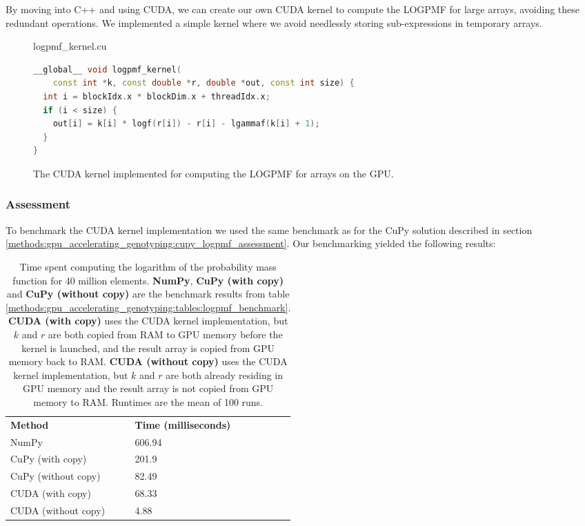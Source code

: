 By moving into C++ and using CUDA, we can create our own CUDA kernel to compute the LOGPMF for large arrays, avoiding these redundant operations.
We implemented a simple kernel where we avoid needlessly storing sub-expressions in temporary arrays.
\begin{figure}[H] 
\begin{center}
logpmf\_kernel.cu
\end{center}
\begin{lstlisting}[language=C++,style=cppcode]
__global__ void logpmf_kernel(
    const int *k, const double *r, double *out, const int size) {
  int i = blockIdx.x * blockDim.x + threadIdx.x;
  if (i < size) {
    out[i] = k[i] * logf(r[i]) - r[i] - lgammaf(k[i] + 1);
  }
}
\end{lstlisting}
\caption{
  The CUDA kernel implemented for computing the LOGPMF for arrays on the GPU.
}
\label{methods:gpu_accelerating_genotyping:figures:logpmf_kernel}
\end{figure}

\subsubsection{Assessment}
To benchmark the CUDA kernel implementation we used the same benchmark as for the CuPy solution described in section \ref{methods:gpu_accelerating_genotyping:cupy_logpmf_assessment}.
Our benchmarking yielded the following results:
\begin{table}[H]
\begin{center}
\begin{tabular}{lllll}
\multicolumn{1}{l|}{\textbf{Method}} & \multicolumn{1}{l}{\textbf{Time (milliseconds)}} &  \\ \cline{1-2}
\multicolumn{1}{l|}{NumPy} & \multicolumn{1}{l}{606.94} &  \\
\multicolumn{1}{l|}{CuPy (with copy)} & \multicolumn{1}{l}{201.9} & \\
\multicolumn{1}{l|}{CuPy (without copy)} & \multicolumn{1}{l}{82.49} & \\
\multicolumn{1}{l|}{CUDA (with copy)} & \multicolumn{1}{l}{68.33} & \\
\multicolumn{1}{l|}{CUDA (without copy)} & \multicolumn{1}{l}{4.88}
\end{tabular}
\end{center}
\caption{
  Time spent computing the logarithm of the probability mass function for 40 million elements.
  \textbf{NumPy}, \textbf{CuPy (with copy)} and \textbf{CuPy (without copy)} are the benchmark results from table \ref{methods:gpu_accelerating_genotyping:tables:logpmf_benchmark}.
  \textbf{CUDA (with copy)} uses the CUDA kernel implementation, but $k$ and $r$ are both copied from RAM to GPU memory before the kernel is launched, and the result array is copied from GPU memory back to RAM.
  \textbf{CUDA (without copy)} uses the CUDA kernel implementation, but $k$ and $r$ are both already residing in GPU memory and the result array is not copied from GPU memory to RAM.
  Runtimes are the mean of 100 runs.
}
\label{methods:gpu_accelerating_genotyping:tables:logpmf_benchmark_2}
\end{table}

